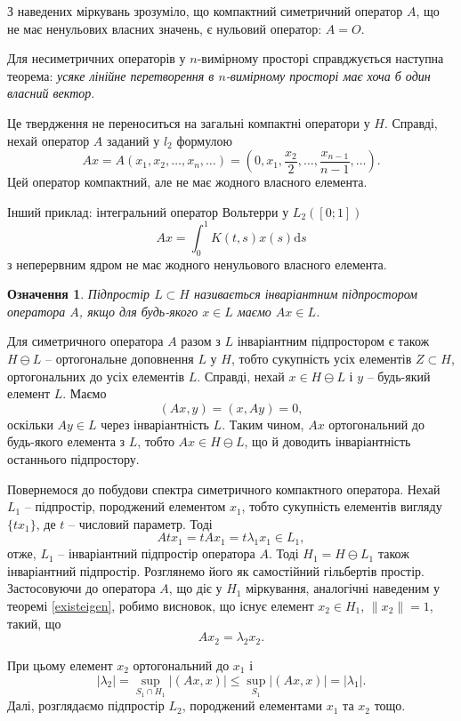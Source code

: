 \documentclass[14pt,twoside]{extreport}
\theoremstyle{mystyle}
\newtheorem{dfn}{Означення}
\numberwithin{equation}{chapter}
\begin{document}
З наведених міркувань зрозуміло, що компактний симетричний оператор $A$, що не має ненульових власних значень, є нульовий оператор: $A = O$.

Для несиметричних операторів у $n$-вимірному просторі справджується наступна теорема: \emph{усяке лінійне перетворення в $n$-вимірному просторі має хоча б один власний вектор}.

Це твердження не переноситься на загальні компактні оператори у $H$. Справді, нехай оператор $A$ заданий у $l_2$ формулою
\[
 Ax=A(x_1, x_2, \ldots, x_n, \ldots) = \left(0, x_1, \frac{x_2}{2}, \dots, \frac{x_{n-1}}{n-1}, \dots\right).
\]
Цей оператор компактний, але не має жодного власного елемента.

Інший приклад: інтегральний оператор Вольтерри у $L_2([0; 1])$
\[
 Ax=\int_{0}^{1} K(t, s) x(s) \mathrm{d}s
\]
з неперервним ядром не має жодного ненульового власного елемента.

\begin{dfn}
Підпростір $L \subset H$ називається інваріантним підпростором оператора $A$, якщо для будь-якого $x \in L$ маємо $Ax \in L$.
\end{dfn}

Для симетричного оператора $A$ разом з $L$ інваріантним підпростором є також $H \ominus L$ -- ортогональне доповнення $L$ у $H$, тобто сукупність усіх елементів $Z \subset H$, ортогональних до усіх елементів $L$. Справді, нехай $x \in H \ominus L$ і $y$ -- будь-який елемент $L$. Маємо
\[
 (Ax, y) = (x, Ay) = 0,
\]
оскільки $Ay \in L$ через інваріантність $L$. Таким чином, $Ax$ ортогональний до будь-якого елемента з $L$, тобто $Ax \in H \ominus L$, що й доводить інваріантність останнього підпростору.

Повернемося до побудови спектра симетричного компактного оператора. Нехай $L_1$ -- підпростір, породжений елементом $x_1$, тобто сукупність елементів вигляду $\{tx_1\}$, де $t$ -- числовий параметр. Тоді
\[
 Atx_1 = tAx_1 = t\lambda_1 x_1 \in L_1,
\]
отже, $L_1$ -- інваріантний підпростір оператора $A$. Тоді $H_1 = H \ominus L_1$ також інваріантний підпростір. Розглянемо його як самостійний гільбертів простір. Застосовуючи до оператора $A$, що діє у $H_1$ міркування, аналогічні наведеним у теоремі \ref{existeigen}, робимо висновок, що існує елемент $x_2 \in H_1$, $\|x_2\| =1$, такий, що
\[
 Ax_2 = \lambda_2 x_2.
\]

При цьому елемент $x_2$ ортогональний до $x_1$ і
\[
 |\lambda_2| = \sup\limits_{S_1\cap H_1} |(Ax, x)| \leqslant \sup\limits_{S_1} |(Ax, x)| = |\lambda_1|.
\]
Далі, розглядаємо підпростір $L_2$, породжений елементами $x_1$ та $x_2$ тощо.
\end{document}
